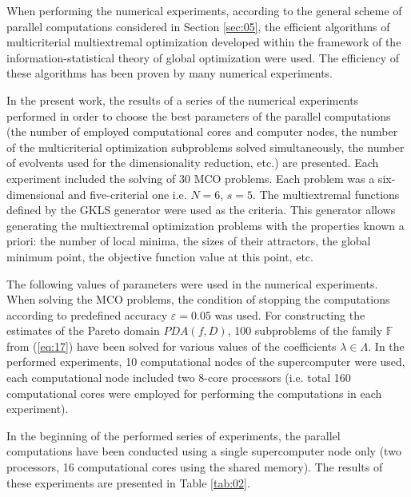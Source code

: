 \documentclass{svproc}
\begin{document}
When performing the numerical experiments, according to the general scheme of parallel computations considered in Section \ref{sec:05}, the efficient algorithms of multicriterial multiextremal optimization \cite{x12,x13,x14,x15,x16,x17} developed within the framework of the information-statistical theory of global optimization \cite{x18} were used. The efficiency of these algorithms has been proven by many numerical experiments.

In the present work, the results of a series of the numerical experiments performed in order to choose the best parameters of the parallel computations (the number of employed computational cores and computer nodes, the number of the multicriterial optimization subproblems solved simultaneously, the number of evolvents used for the dimensionality reduction, etc.) are presented. Each experiment included the solving of 30 MCO problems. Each problem was a six-dimensional and five-criterial one i.e. $N=6$, $s=5$. The multiextremal functions defined by the GKLS generator \cite{x36} were used as the criteria. This generator allows generating the multiextremal optimization problems with the properties known a priori: the number of local minima, the sizes of their attractors, the global minimum point, the objective function value at this point, etc. 

The following values of parameters were used in the numerical experiments. When solving the MCO problems, the condition of stopping the computations according to predefined accuracy $\varepsilon=0.05$ was used. For constructing the estimates of the Pareto domain $PDA(f,D)$, 100 subproblems of the family $\mathbb{F}$ from (\ref{eq:17}) have been solved for various values of the coefficients $\lambda \in \Lambda$. In the performed experiments, 10 computational nodes of the supercomputer were used, each computational node included two 8-core processors (i.e. total 160 computational cores were employed for performing the computations in each experiment). 

In the beginning of the performed series of experiments, the parallel computations have been conducted using a single supercomputer node only (two processors, 16 computational cores using the shared memory). The results of these experiments are presented in Table \ref{tab:02}.
\end{document}
